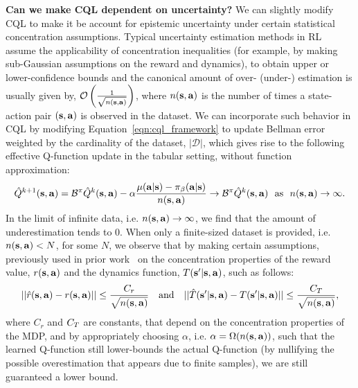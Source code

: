 \textbf{Can we make CQL dependent on uncertainty?} We can slightly modify CQL to make it be account for epistemic uncertainty under certain statistical concentration assumptions. Typical uncertainty estimation methods in RL~\citep{osband2016deep,jaksch2010near} assume the applicability of concentration inequalities (for example, by making sub-Gaussian assumptions on the reward and dynamics), to obtain upper or lower-confidence bounds and the canonical amount of over- (under-) estimation is usually given by,  $\mathcal{O}\left(\frac{1}{\sqrt{n(\mathbf{s}, \mathbf{a})}}\right)$, where $n(\mathbf{s}, \mathbf{a})$ is the number of times a state-action pair $(\mathbf{s}, \mathbf{a})$ is observed in the dataset. We can incorporate such behavior in CQL by modifying Equation~\ref{eqn:cql_framework} to update Bellman error weighted by the cardinality of the dataset, $|\mathcal{D}|$, which gives rise to the following effective Q-function update in the tabular setting, without function approximation:
\begin{equation*}
    \hat{Q}^{k+1}(\mathbf{s}, \mathbf{a}) = \mathcal{B}^\pi \hat{Q}^k(\mathbf{s}, \mathbf{a}) - \alpha \frac{\mu(\mathbf{a}|\mathbf{s}) - {\pi_\beta}(\mathbf{a}|\mathbf{s})}{n(\mathbf{s},\mathbf{a})} \rightarrow \mathcal{B}^\pi \hat{Q}^k(\mathbf{s}, \mathbf{a}) \text{~~as~~} n(\mathbf{s}, \mathbf{a}) \rightarrow \infty.
\end{equation*}
In the limit of infinite data, i.e. $n(\mathbf{s}, \mathbf{a}) \rightarrow \infty$, we find that the amount of underestimation tends to $0$. When only a finite-sized dataset is provided, i.e. $n(\mathbf{s}, \mathbf{a}) < N$, for some $N$, we observe that by making certain assumptions, previously used in prior work~\citep{jaksch2010near,osband2016deep} on the concentration properties of the reward value, $r(\mathbf{s}, \mathbf{a})$ and the dynamics function, $T(\mathbf{s}'|\mathbf{s}, \mathbf{a})$, such as follows:
\begin{equation*}
    ||\hat{r}(\mathbf{s}, \mathbf{a}) - r(\mathbf{s}, \mathbf{a})|| \leq \frac{C_r}{\sqrt{n(\mathbf{s}, \mathbf{a})}} ~~~ \text{and} ~~~ ||\hat{T}(\mathbf{s}'|\mathbf{s}, \mathbf{a}) - T(\mathbf{s}'|\mathbf{s}, \mathbf{a})|| \leq \frac{C_T}{\sqrt{n(\mathbf{s}, \mathbf{a})}}, 
\end{equation*}
where $C_r$ and $C_T$ are constants, that depend on the concentration properties of the MDP, and by appropriately choosing $\alpha$, i.e. $\alpha = \Omega (n(\mathbf{s}, \mathbf{a}))$, such that the learned Q-function still lower-bounds the actual Q-function (by nullifying the possible overestimation that appears due to finite samples), we are still guaranteed a lower bound. 


